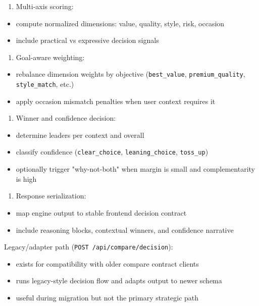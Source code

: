 \documentclass[12pt,a4paper]{report}
\begin{document}
\begin{enumerate}
\item Multi-axis scoring:
\end{enumerate}
\begin{itemize}
\item compute normalized dimensions: value, quality, style, risk, occasion
\item include practical vs expressive decision signals
\end{itemize}
\begin{enumerate}
\item Goal-aware weighting:
\end{enumerate}
\begin{itemize}
\item rebalance dimension weights by objective (\texttt{best\_value}, \texttt{premium\_quality}, \texttt{style\_match}, etc.)
\item apply occasion mismatch penalties when user context requires it
\end{itemize}
\begin{enumerate}
\item Winner and confidence decision:
\end{enumerate}
\begin{itemize}
\item determine leaders per context and overall
\item classify confidence (\texttt{clear\_choice}, \texttt{leaning\_choice}, \texttt{toss\_up})
\item optionally trigger "why-not-both" when margin is small and complementarity is high
\end{itemize}
\begin{enumerate}
\item Response serialization:
\end{enumerate}
\begin{itemize}
\item map engine output to stable frontend decision contract
\item include reasoning blocks, contextual winners, and confidence narrative
\end{itemize}

Legacy/adapter path (\texttt{POST /api/compare/decision}):

\begin{itemize}
\item exists for compatibility with older compare contract clients
\item runs legacy-style decision flow and adapts output to newer schema
\item useful during migration but not the primary strategic path
\end{itemize}
\end{document}
